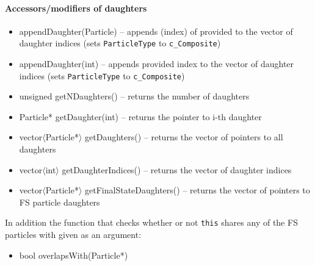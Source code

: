 \paragraph{Accessors/modifiers of daughters}

\begin{itemize}
 \item {\bluett appendDaughter(Particle)} -- appends (index) of provided \particle to the vector of daughter indices (sets {\tt ParticleType} to {\tt c\_Composite})
 \item {\bluett appendDaughter(int)} -- appends provided index to the vector of daughter indices (sets {\tt ParticleType} to {\tt c\_Composite})
 \item {\bluett unsigned getNDaughters()} -- returns the number of daughters
 \item {\bluett Particle* getDaughter(int)} -- returns the pointer to i-th daughter
 \item {\bluett vector$\langle$Particle*$\rangle$ getDaughters()} -- returns the vector of pointers to all daughters
 \item {\bluett vector$\langle$int$\rangle$ getDaughterIndices()} -- returns the vector of daughter indices
 \item {\bluett vector$\langle$Particle*$\rangle$ getFinalStateDaughters()} -- returns the vector of pointers to FS particle daughters
\end{itemize}

In addition the function that checks whether or not {\tt this} \particle shares any of the FS particles with \particle given as an argument:
\begin{itemize}
 \item {\bluett bool overlapsWith(Particle*)}
\end{itemize}
